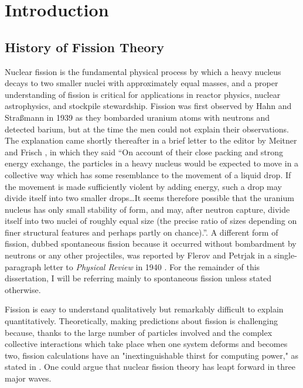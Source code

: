 \chapter{Introduction}\label{chap:Intro}

\section{History of Fission Theory}
Nuclear fission is the fundamental physical process by which a heavy nucleus decays to two smaller nuclei with approximately equal masses, and a proper understanding of fission is critical for applications in reactor physics, nuclear astrophysics, and stockpile stewardship. Fission was first observed by Hahn and Stra\ss{}mann in 1939 \cite{Hahn1939} as they bombarded uranium atoms with neutrons and detected barium, but at the time the men could not explain their observations. The explanation came shortly thereafter in a brief letter to the editor by Meitner and Frisch \cite{Meitner1939b}, in which they said ``On account of their close packing and strong energy exchange, the particles in a heavy nucleus would be expected to move in a collective way which has some resemblance to the movement of a liquid drop. If the movement is made sufficiently violent by adding energy, such a drop may divide itself into two smaller drops\dots It seems therefore possible that the uranium nucleus has only small stability of form, and may, after neutron capture, divide itself into two nuclei of roughly equal size (the precise ratio of sizes depending on finer structural features and perhaps partly on chance).''. A different form of fission, dubbed spontaneous fission because it occurred without bombardment by neutrons or any other projectiles, was reported by Flerov and Petrjak in a single-paragraph letter to \textit{Physical Review} in 1940 \cite{Flerov1940}. For the remainder of this dissertation, I will be referring mainly to spontaneous fission unless stated otherwise.


Fission is easy to understand qualitatively but remarkably difficult to explain quantitatively. Theoretically, making predictions about fission is challenging because, thanks to the large number of particles involved and the complex collective interactions which take place when one system deforms and becomes two, fission calculations have an "inextinguishable thirst for computing power," as stated in \cite{Schunck2016}. One could argue that nuclear fission theory has leapt forward in three major waves.

